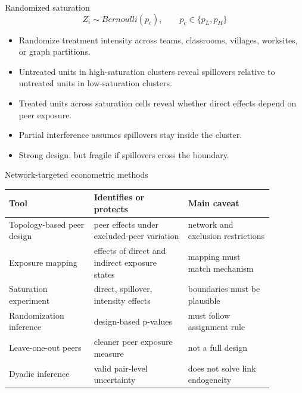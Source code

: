 \documentclass[aspectratio=169,11pt]{beamer}
\newcommand{\1}{\mathbf{1}}
\begin{document}
\begin{frame}{Randomized saturation}
\small
\[
Z_i \sim Bernoulli(p_c), \qquad p_c \in \{p_L,p_H\}
\]

\begin{itemize}
    \item Randomize treatment intensity across teams, classrooms, villages, worksites, or graph partitions.
    \item Untreated units in high-saturation clusters reveal spillovers relative to untreated units in low-saturation clusters.
    \item Treated units across saturation cells reveal whether direct effects depend on peer exposure.
    \item Partial interference assumes spillovers stay inside the cluster.
    \item Strong design, but fragile if spillovers cross the boundary.
\end{itemize}
\end{frame}

\begin{frame}{Network-targeted econometric methods}
\small
\begin{tabular}{p{0.28\linewidth} p{0.31\linewidth} p{0.29\linewidth}}
\toprule
Tool & Identifies or protects & Main caveat \\
\midrule
Topology-based peer design & peer effects under excluded-peer variation & network and exclusion restrictions \\
Exposure mapping & effects of direct and indirect exposure states & mapping must match mechanism \\
Saturation experiment & direct, spillover, intensity effects & boundaries must be plausible \\
Randomization inference & design-based p-values & must follow assignment rule \\
Leave-one-out peers & cleaner peer exposure measure & not a full design \\
Dyadic inference & valid pair-level uncertainty & does not solve link endogeneity \\
\bottomrule
\end{tabular}
\end{frame}
\end{document}
